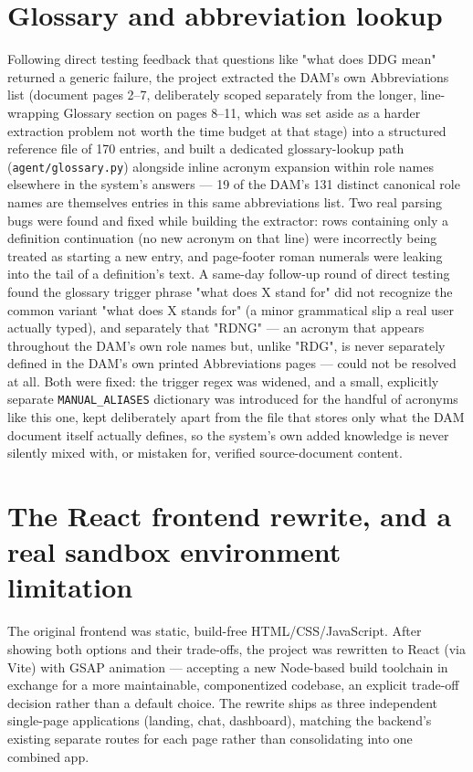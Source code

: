 \section{Glossary and abbreviation lookup}
Following direct testing feedback that questions like "what does DDG mean" returned a generic failure, the project extracted the DAM's own Abbreviations list (document pages 2–7, deliberately scoped separately from the longer, line-wrapping Glossary section on pages 8–11, which was set aside as a harder extraction problem not worth the time budget at that stage) into a structured reference file of 170 entries, and built a dedicated glossary-lookup path (\texttt{agent/\allowbreak{}glossary.py}) alongside inline acronym expansion within role names elsewhere in the system's answers — 19 of the DAM's 131 distinct canonical role names are themselves entries in this same abbreviations list. Two real parsing bugs were found and fixed while building the extractor: rows containing only a definition continuation (no new acronym on that line) were incorrectly being treated as starting a new entry, and page-footer roman numerals were leaking into the tail of a definition's text. A same-day follow-up round of direct testing found the glossary trigger phrase "what does X stand for" did not recognize the common variant "what does X stands for" (a minor grammatical slip a real user actually typed), and separately that "RDNG" — an acronym that appears throughout the DAM's own role names but, unlike "RDG", is never separately defined in the DAM's own printed Abbreviations pages — could not be resolved at all. Both were fixed: the trigger regex was widened, and a small, explicitly separate \texttt{MANUAL\_\allowbreak{}ALIASES} dictionary was introduced for the handful of acronyms like this one, kept deliberately apart from the file that stores only what the DAM document itself actually defines, so the system's own added knowledge is never silently mixed with, or mistaken for, verified source-document content.

\section{The React frontend rewrite, and a real sandbox environment limitation}
The original frontend was static, build-free HTML/CSS/JavaScript. After showing both options and their trade-offs, the project was rewritten to React (via Vite) with GSAP animation — accepting a new Node-based build toolchain in exchange for a more maintainable, componentized codebase, an explicit trade-off decision rather than a default choice. The rewrite ships as three independent single-page applications (landing, chat, dashboard), matching the backend's existing separate routes for each page rather than consolidating into one combined app.

